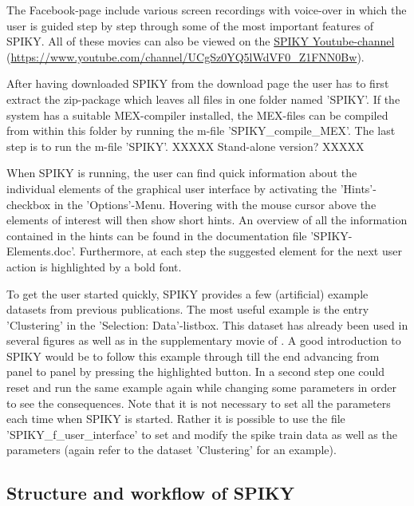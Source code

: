 \documentclass[10pt,twocolumn]{elsart5p}
\begin{document}
The Facebook-page include various screen recordings with voice-over in which the user is guided step by step through some of the most important features of SPIKY. All of these movies can also be viewed on the \href{https://www.youtube.com/channel/UCgSz0YQ5lWdVF0_Z1FNN0Bw}{SPIKY Youtube-channel} (\url{https://www.youtube.com/channel/UCgSz0YQ5lWdVF0_Z1FNN0Bw}).

After having downloaded SPIKY from the download page the user has to first extract the zip-package which leaves all files in one folder named 'SPIKY'. If the system has a suitable MEX-compiler installed, the MEX-files can be compiled from within this folder by running the m-file 'SPIKY\_compile\_MEX'. The last step is to run the m-file 'SPIKY'. XXXXX Stand-alone version? XXXXX 

When SPIKY is running, the user can find quick information about the individual elements of the graphical user interface by activating the 'Hints'-checkbox in the 'Options'-Menu. Hovering with the mouse cursor above the elements of interest will then show short hints. An overview of all the information contained in the hints can be found in the documentation file 'SPIKY-Elements.doc'. Furthermore, at each step the suggested element for the next user action is highlighted by a bold font. 

To get the user started quickly, SPIKY provides a few (artificial) example datasets from previous publications. The most useful example is the entry 'Clustering' in the 'Selection: Data'-listbox. This dataset has already been used in several figures as well as in the supplementary movie of \cite{Kreuz13}. A good introduction to SPIKY would be to follow this example through till the end advancing from panel to panel by pressing the highlighted button. In a second step one could reset and run the same example again while changing some parameters in order to see the consequences. Note that it is not necessary to set all the parameters each time when SPIKY is started. Rather it is possible to use the file 'SPIKY\_f\_user\_interface' to set and modify the spike train data as well as the parameters (again refer to the dataset 'Clustering' for an example).


\subsection{\label{ss:Structure} Structure and workflow of SPIKY}
\end{document}
